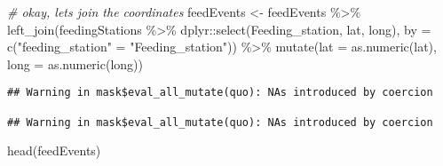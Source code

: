 \documentclass[
]{article}
\newenvironment{Shaded}{\begin{snugshade}}{\end{snugshade}}
\newcommand{\AttributeTok}[1]{\textcolor[rgb]{0.77,0.63,0.00}{#1}}
\newcommand{\CommentTok}[1]{\textcolor[rgb]{0.56,0.35,0.01}{\textit{#1}}}
\newcommand{\FunctionTok}[1]{\textcolor[rgb]{0.00,0.00,0.00}{#1}}
\newcommand{\NormalTok}[1]{#1}
\newcommand{\OtherTok}[1]{\textcolor[rgb]{0.56,0.35,0.01}{#1}}
\newcommand{\SpecialCharTok}[1]{\textcolor[rgb]{0.00,0.00,0.00}{#1}}
\newcommand{\StringTok}[1]{\textcolor[rgb]{0.31,0.60,0.02}{#1}}
\begin{document}
\begin{Shaded}
\begin{Highlighting}[]
\CommentTok{\# okay, let\textquotesingle{}s join the coordinates}
\NormalTok{feedEvents }\OtherTok{\textless{}{-}}\NormalTok{ feedEvents }\SpecialCharTok{\%\textgreater{}\%}
  \FunctionTok{left\_join}\NormalTok{(feedingStations }\SpecialCharTok{\%\textgreater{}\%}
\NormalTok{              dplyr}\SpecialCharTok{::}\FunctionTok{select}\NormalTok{(Feeding\_station, lat, long),}
            \AttributeTok{by =} \FunctionTok{c}\NormalTok{(}\StringTok{"feeding\_station"} \OtherTok{=} \StringTok{"Feeding\_station"}\NormalTok{)) }\SpecialCharTok{\%\textgreater{}\%}
  \FunctionTok{mutate}\NormalTok{(}\AttributeTok{lat =} \FunctionTok{as.numeric}\NormalTok{(lat),}
         \AttributeTok{long =} \FunctionTok{as.numeric}\NormalTok{(long))}
\end{Highlighting}
\end{Shaded}

\begin{verbatim}
## Warning in mask$eval_all_mutate(quo): NAs introduced by coercion

## Warning in mask$eval_all_mutate(quo): NAs introduced by coercion
\end{verbatim}

\begin{Shaded}
\begin{Highlighting}[]
\FunctionTok{head}\NormalTok{(feedEvents)}
\end{Highlighting}
\end{Shaded}
\end{document}
